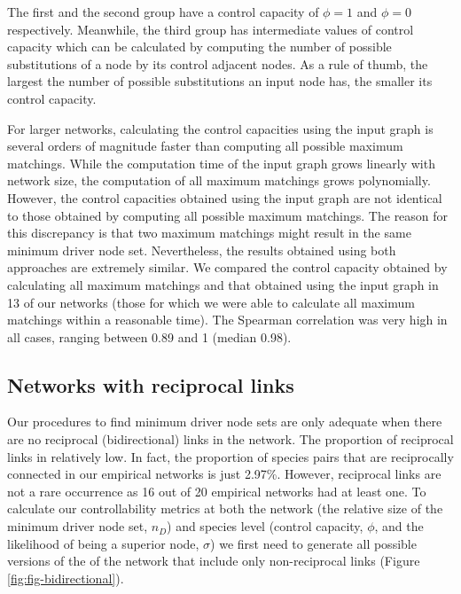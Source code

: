 \documentclass[a4paper]{artikel1}
\theoremstyle{definition}
\theoremstyle{definition}
\theoremstyle{definition}
\theoremstyle{remark}
\begin{document}
The first and the second group have a control capacity of \(\phi = 1\)
and \(\phi = 0\) respectively. Meanwhile, the third group has
intermediate values of control capacity which can be calculated by
computing the number of possible substitutions of a node by its control
adjacent nodes. As a rule of thumb, the largest the number of possible
substitutions an input node has, the smaller its control capacity.

For larger networks, calculating the control capacities using the input
graph is several orders of magnitude faster than computing all possible
maximum matchings. While the computation time of the input graph grows
linearly with network size, the computation of all maximum matchings
grows polynomially. However, the control capacities obtained using the
input graph are not identical to those obtained by computing all
possible maximum matchings. The reason for this discrepancy is that two
maximum matchings might result in the same minimum driver node set.
Nevertheless, the results obtained using both approaches are extremely
similar. We compared the control capacity obtained by calculating all
maximum matchings and that obtained using the input graph in 13 of our
networks (those for which we were able to calculate all maximum
matchings within a reasonable time). The Spearman correlation was very
high in all cases, ranging between 0.89 and 1 (median 0.98).

\clearpage

\subsection{Networks with reciprocal links}\label{reciprocal-links}

Our procedures to find minimum driver node sets are only adequate when
there are no reciprocal (bidirectional) links in the network. The
proportion of reciprocal links in relatively low. In fact, the
proportion of species pairs that are reciprocally connected in our
empirical networks is just 2.97\%. However, reciprocal links are not a
rare occurrence as 16 out of 20 empirical networks had at least one. To
calculate our controllability metrics at both the network (the relative
size of the minimum driver node set, \(n_D\)) and species level (control
capacity, \(\phi\), and the likelihood of being a superior node,
\(\sigma\)) we first need to generate all possible versions of the of
the network that include only non-reciprocal links (Figure
\ref{fig:fig-bidirectional}).
\end{document}
